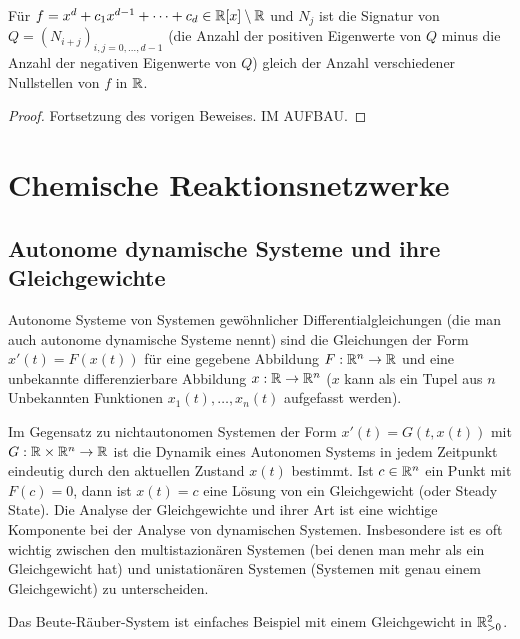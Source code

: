 \documentclass[11pt]{article}
\numberwithin{equation}{section}
\begin{document}
\begin{theorem}
	Für $f = x^d + c_1 x^{d-1} + \cdots + c_d \in \mathbb{R}[x] \setminus \mathbb{R}$ und $N_j$ ist die Signatur von $Q = (N_{i+j})_{i,j=0,\ldots,d-1}$ (die Anzahl der positiven Eigenwerte von $Q$ minus die Anzahl der negativen Eigenwerte von $Q$) gleich der Anzahl verschiedener Nullstellen von $f$ in $\mathbb{R}$. 
\end{theorem} 
\begin{proof} 
	Fortsetzung des vorigen Beweises. IM AUFBAU.
\end{proof} 

 
 \section{Chemische Reaktionsnetzwerke} 
 
 \subsection{Autonome dynamische Systeme und ihre Gleichgewichte}
 
 
 Autonome Systeme von Systemen gewöhnlicher Differentialgleichungen (die man auch autonome dynamische Systeme nennt) sind die Gleichungen der Form $x'(t) = F(x(t))$ für eine gegebene Abbildung $F : \mathbb{R}^n \to \mathbb{R}$ und eine  unbekannte differenzierbare Abbildung $x: \mathbb{R} \to \mathbb{R}^n$ ($x$ kann als ein Tupel aus $n$ Unbekannten Funktionen $x_1(t),\ldots, x_n(t)$ aufgefasst werden). 

 Im Gegensatz zu nichtautonomen Systemen der Form $x'(t) = G(t,x(t))$ mit $G : \mathbb{R} \times \mathbb{R}^n \to \mathbb{R}$ ist die Dynamik eines Autonomen Systems in jedem Zeitpunkt eindeutig durch den aktuellen Zustand $x(t)$ bestimmt. 
  Ist $c \in \mathbb{R}^n$ ein Punkt mit $F(c)=0$, dann ist $x(t) = c$ eine Lösung von ein Gleichgewicht (oder Steady State). Die Analyse der Gleichgewichte und ihrer Art ist eine wichtige Komponente bei der Analyse von dynamischen Systemen. Insbesondere ist es oft wichtig zwischen den multistazionären Systemen (bei denen man mehr als ein Gleichgewicht hat) und unistationären Systemen (Systemen mit genau einem Gleichgewicht) zu unterscheiden.  
 
Das Beute-Räuber-System ist einfaches Beispiel mit einem Gleichgewicht in $\mathbb{R}_{>0}^2$.  
\end{document}
